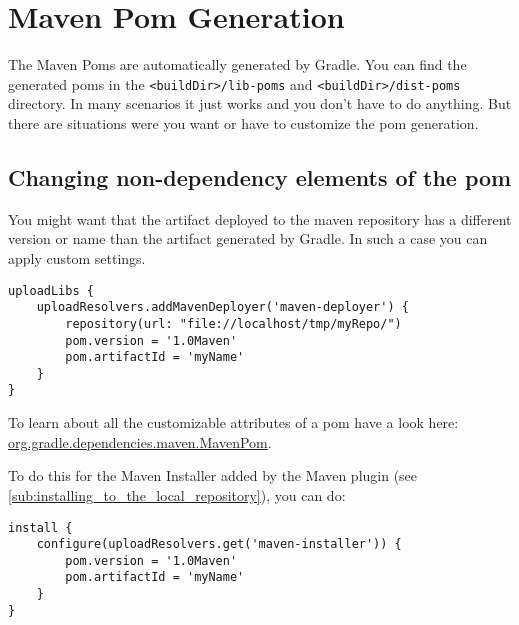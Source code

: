 \section{Maven Pom Generation} %
\label{sec:maven_pom_generation}
The Maven Poms are automatically generated by Gradle. You can find the generated poms in the \texttt{<buildDir>/lib-poms} and \texttt{<buildDir>/dist-poms} directory. In many scenarios it just works and you don't have to do anything. But there are situations were you want or have to customize the pom generation.
\subsection{Changing non-dependency elements of the pom} %
\label{sub:changing_non_dependency_elements_of_the_pom}
You might want that the artifact deployed to the maven repository has a different version or name than the artifact generated by Gradle. In such a case you can apply custom settings.
\begin{Verbatim}
uploadLibs {
    uploadResolvers.addMavenDeployer('maven-deployer') {
        repository(url: "file://localhost/tmp/myRepo/")
        pom.version = '1.0Maven'
        pom.artifactId = 'myName'
    }
}
\end{Verbatim}
To learn about all the customizable attributes of a pom have a look here: \href{\API dependencies/maven/MavenPom.html}{org.gradle.dependencies.maven.MavenPom}.

To do this for the Maven Installer added by the Maven plugin (see \ref{sub:installing_to_the_local_repository}), you can do:
\begin{Verbatim}
install {
    configure(uploadResolvers.get('maven-installer')) {
        pom.version = '1.0Maven'
        pom.artifactId = 'myName'
    }
}
\end{Verbatim}
